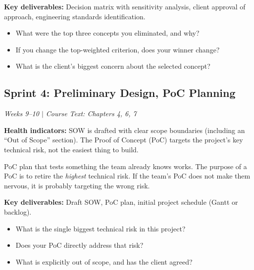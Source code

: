 \textbf{Key deliverables:} Decision matrix with sensitivity analysis, client approval of approach, engineering standards identification.

\begin{paquestion}
\begin{itemize}[nosep,leftmargin=1.5em]
\item What were the top three concepts you eliminated, and why?
\item If you change the top-weighted criterion, does your winner change?
\item What is the client's biggest concern about the selected concept?
\end{itemize}
\end{paquestion}


\subsection{Sprint 4: Preliminary Design, PoC Planning}
\textit{Weeks 9--10 $|$ Course Text: Chapters 4, 6, 7}

\textbf{Health indicators:} SOW is drafted with clear scope boundaries (including an ``Out of Scope'' section). The Proof of Concept (PoC) targets the project's key technical risk, not the easiest thing to build.

\begin{redflag}
PoC plan that tests something the team already knows works. The purpose of a PoC is to retire the \emph{highest} technical risk. If the team's PoC does not make them nervous, it is probably targeting the wrong risk.
\end{redflag}

\textbf{Key deliverables:} Draft SOW, PoC plan, initial project schedule (Gantt or backlog).

\begin{paquestion}
\begin{itemize}[nosep,leftmargin=1.5em]
\item What is the single biggest technical risk in this project?
\item Does your PoC directly address that risk?
\item What is explicitly out of scope, and has the client agreed?
\end{itemize}
\end{paquestion}


